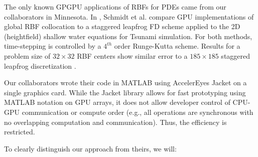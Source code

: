 The only known GPGPU applications of RBFs for PDEs came from our collaborators in Minnesota. In \cite{Schmidt:2009a, Schmidt:2009b}, Schmidt et al. compare GPU implementations of global RBF collocation to a staggered leapfrog FD scheme applied to the 2D (heightfield) shallow water equations for Tsunami simulation. For both methods, time-stepping is controlled by a $4^{th}$ order Runge-Kutta scheme. Results for a problem size of $32\times32$ RBF centers show similar error to a $185\times 185$ staggered leapfrog discretization \cite{Schmidt:2009b}.

Our collaborators wrote their code in MATLAB using AccelerEyes Jacket \cite{JacketGuide:2009} on a single graphics card. While the Jacket library allows for fast prototyping using MATLAB notation on GPU arrays, it does not allow developer control of CPU-GPU communication or compute order (e.g., all operations are synchronous with no overlapping computation and communication). Thus, the efficiency is restricted. 

To clearly distinguish our approach from theirs, we will: 

